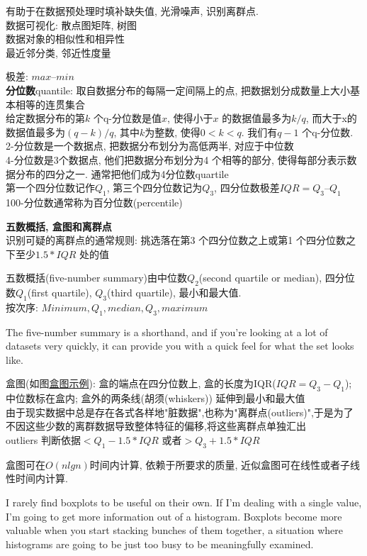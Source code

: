 \documentclass{article}
\begin{document}
有助于在数据预处理时填补缺失值, 光滑噪声, 识别离群点.\\
数据可视化: 散点图矩阵, 树图\\
数据对象的相似性和相异性\\
最近邻分类, 邻近性度量

极差: $max – min$ \\
\textbf{分位数}quantile: 取自数据分布的每隔一定间隔上的点, 把数据划分成数量上大小基本相等的连贯集合\\
给定数据分布的第$k$ 个q-分位数是值$x$, 使得小于$x$ 的数据值最多为$k/q$, 而大于x的数据值最多为$(q-k)/q$, 其中$k$为整数, 使得$0<k<q$. 我们有$q-1$ 个q-分位数.
2-分位数是一个数据点, 把数据分布划分为高低两半, 对应于中位数\\
4-分位数是3个数据点, 他们把数据分布划分为4 个相等的部分, 使得每部分表示数据分布的四分之一. 通常把他们成为4分位数quartile\\
第一个四分位数记作$Q_1$, 第三个四分位数记为$Q_3$, 四分位数极差$IQR = Q_3 – Q_1$\\
100-分位数通常称为百分位数(percentile)

\textbf{五数概括, 盒图和离群点}\\
识别可疑的离群点的通常规则: 挑选落在第3 个四分位数之上或第1 个四分位数之下至少$1.5 * IQR$ 处的值\par
五数概括(five-number summary)由中位数$Q_2$(second quartile or median), 四分位数$Q_1$(first quartile), $Q_3$(third quartile), 最小和最大值. \\
按次序: $Minimum, Q_1, median, Q_3, maximum$

The five-number summary is a shorthand, and if you're looking at a lot of
datasets very quickly, it can provide you with a quick feel for what the set looks like.

盒图(如图\href{http://i.imgbox.com/E7zYvy7e.jpg}{盒图示例}): 
盒的端点在四分位数上, 盒的长度为IQR($IQR = Q_3-Q_1$); 中位数标在盒内; 盒外的两条线(胡须(whiskers)) 延伸到最小和最大值\\

由于现实数据中总是存在各式各样地"脏数据",也称为"离群点(outliers)",于是为了不因这些少数的离群数据导致整体特征的偏移,将这些离群点单独汇出\\
outliers 判断依据$<Q_1 - 1.5*IQR$ 或者$>Q_3 + 1.5*IQR$

盒图可在$O(nlgn)$时间内计算, 依赖于所要求的质量, 近似盒图可在线性或者子线性时间内计算.

I rarely find boxplots to be useful on their own. If I'm dealing with a single value, I'm
going to get more information out of a histogram. Boxplots become more valuable when
you start stacking bunches of them together, a situation where histograms are going to
be just too busy to be meaningfully examined.
\end{document}
